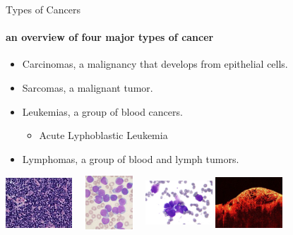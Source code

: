 \documentclass{beamer}
\begin{document}
\begin{frame}{Types of Cancers}
  \framesubtitle{an overview of four major types of cancer}
  \begin{itemize}
    \item Carcinomas, a malignancy that develops from epithelial cells.
    \item Sarcomas, a malignant tumor.
    \item Leukemias, a group of blood cancers.
          \begin{itemize}
            \item Acute Lyphoblastic Leukemia
          \end{itemize}
    \item Lymphomas, a group of blood and lymph tumors.
  \end{itemize}
  \vfill
  \hfill \includegraphics[width=25mm,height=20mm]{resources/lymphomas}
  \hfill \includegraphics[width=25mm,height=20mm]{resources/leukemias}
  \hfill \includegraphics[width=25mm,height=20mm]{resources/carincomas}
  \hfill \includegraphics[width=25mm,height=20mm]{resources/sarcomas}
  \hfill

\end{frame}
\end{document}
